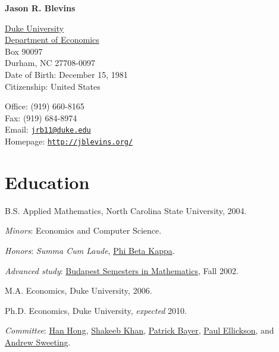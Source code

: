 \documentclass[letterpaper]{article}
\def\name{Jason R. Blevins}
\renewenvironment{itemize}{
  \begin{list}{}{
    \setlength{\leftmargin}{1em}
  }
}{
  \end{list}
}
\begin{document}
\centerline{\huge\bf \name}

\vspace{0.25in}

\begin{minipage}[t]{0.5\textwidth}
  \href{http://www.duke.edu/}{Duke University} \\
  \href{http://www.econ.duke.edu/}{Department of Economics} \\
  Box 90097 \\
  Durham, NC 27708-0097 \\
  Date of Birth: December 15, 1981 \\
  Citizenship: United States
\end{minipage}
\begin{minipage}[t]{0.5\textwidth}
  Office: (919) 660-8165 \\
  Fax: (919) 684-8974 \\
  Email: \href{mailto:jrb11@duke.edu}{\tt jrb11@duke.edu} \\
  Homepage: \href{http://jblevins.org/}{\tt http://jblevins.org/} \\
\end{minipage}

\section*{Education}

\begin{itemize}
  \item B.S. Applied Mathematics, North Carolina State University, 2004.
    \begin{itemize}
    \item \textit{Minors}: Economics and Computer Science.
    \item \textit{Honors}: \textit{Summa Cum Laude},
      \href{http://www.pbk.org/}{Phi Beta Kappa}.
    \item \textit{Advanced study}:
      \href{http://www.stolaf.edu/depts/math-old/budapest/}{Budapest
        Semesters in Mathematics}, Fall 2002.
    \end{itemize}

  \item M.A. Economics, Duke University, 2006.

  \item Ph.D. Economics, Duke University, \textit{expected} 2010.
    \begin{itemize}
    \item \textit{Committee}:
      \href{http://www.stanford.edu/~doubleh/}{Han Hong},
      \href{http://www.econ.duke.edu/~shakeebk/}{Shakeeb Khan},
      \href{http://www.econ.duke.edu/~pb29/}{Patrick Bayer},
      \href{http://www.econ.duke.edu/~paule/}{Paul Ellickson}, and
      \href{http://www.econ.duke.edu/~atsweet/}{Andrew Sweeting}.
    \end{itemize}
\end{itemize}
\end{document}
